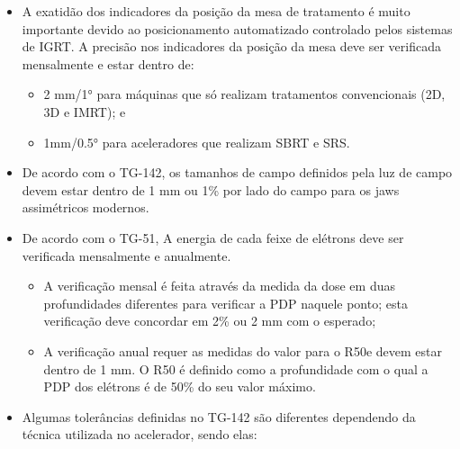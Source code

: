 \documentclass[11pt,a4paper]{article}
\newcounter{exemplo}
\begin{document}
\begin{exemplo}[11. Qualidade ]
\begin{itemize}
        \item A exatidão dos indicadores da posição da mesa de tratamento é muito importante devido ao posicionamento automatizado controlado pelos sistemas de IGRT. A precisão nos indicadores da posição da mesa deve ser verificada mensalmente e estar dentro de:
            \begin{itemize}[label=\textcolor{CarnationPink}{$\blacktriangleright$}]
                \item 2 mm/\ang{1} para máquinas que só realizam tratamentos convencionais (2D, 3D e IMRT); e
                \item 1mm/\ang{0.5} para aceleradores que realizam SBRT e SRS.
            \end{itemize}

        \item De acordo com o TG-142, os tamanhos de campo definidos pela luz de campo devem estar dentro de 1 mm ou 1\% por lado do campo para os jaws assimétricos modernos.
        
        \item De acordo com o TG-51, A energia de cada feixe de elétrons deve ser verificada mensalmente e anualmente. 
            \begin{itemize}[label=\textcolor{CarnationPink}{$\blacktriangleright$}]
                \item A verificação mensal é feita através da medida da dose em duas profundidades diferentes para verificar a PDP naquele ponto; esta verificação deve concordar em 2\% ou 2 mm com o esperado;
                \item A verificação anual requer as medidas do valor para o R50e devem estar dentro de 1 mm. O R50 é definido como a profundidade com o qual a PDP dos elétrons é de 50\% do seu valor máximo.
            \end{itemize}

        \item Algumas tolerâncias definidas no TG-142 são diferentes dependendo da técnica utilizada no acelerador, sendo elas:
        

\end{itemize}
\end{exemplo}
\end{document}
